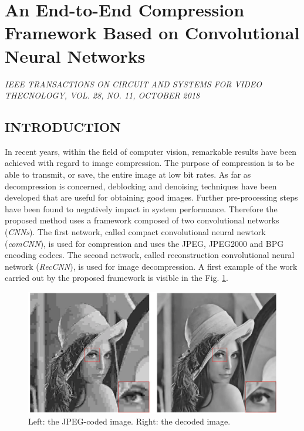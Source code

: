 \section{An End-to-End Compression Framework Based
on Convolutional Neural Networks}

\begin{flushleft}
    \author{
    Feng Jiang, 
    Wen Tao, 
    Shaohui Liu, 
    Jie Ren, 
    Xun Guo, 
    Debin Zhao, 
    \emph{Member, IEEE}
    }
\end{flushleft}

\begin{center}
    \emph{IEEE TRANSACTIONS ON CIRCUIT AND SYSTEMS FOR VIDEO THECNOLOGY, VOL. 28, NO. 11, OCTOBER 2018}
\end{center}

\subsection{INTRODUCTION}
In recent years, within the field of computer vision, remarkable results have 
been achieved with regard to image compression. The purpose of compression 
is to be able to transmit, or save, the entire image at low bit rates. As far as 
decompression is concerned, deblocking and denoising techniques have been 
developed that are useful for obtaining good images. Further pre-processing 
steps have been found to negatively impact in system performance. Therefore 
the proposed method uses a framework composed of two convolutional 
networks (\emph{CNNs}). The first network, called compact convolutional neural 
newtork (\emph{comCNN}), is used for compression and uses the JPEG, JPEG2000 
and BPG encoding codecs. The second network, called reconstruction convolutional 
neural network (\emph{RecCNN}), is used for image decompression. A 
first example of the work carried out by the proposed framework is visible in 
the Fig. \ref{fig:output}.
\begin{figure}[h!]
    \centering
    \includegraphics[width = 0.6 \linewidth]{images/paper3/output .png}
    \centering
    \caption{Left: the JPEG-coded image. Right: the decoded image.}
    \label{fig:output}
\end{figure}


